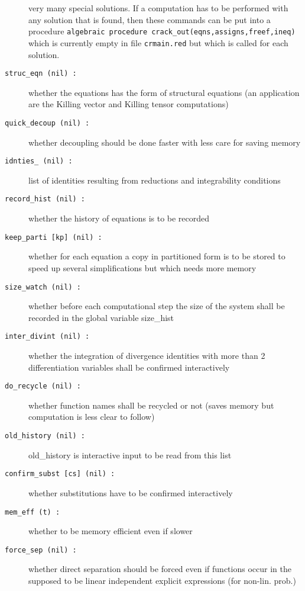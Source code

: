 \documentclass[12pt]{article}
\begin{document}
\begin{description}
                    very many special solutions. If a computation has
                    to be performed with any solution that is found,
                    then these commands can be put into a procedure
                 {\tt algebraic procedure crack\_out(eqns,assigns,freef,ineq)}
                    which is currently empty in file {\tt crmain.red}
                    but which is called for each solution.
\item[{\tt struc\_eqn (nil) :}] whether the equations has the form of
                    structural equations (an application are the
                    Killing vector and Killing tensor computations)
\item[{\tt quick\_decoup (nil) :}] whether decoupling should be done
                    faster with less care for saving memory
\item[{\tt idnties\_ (nil) :}] list of identities resulting from reductions and
                    integrability conditions
\item[{\tt record\_hist (nil) :}] whether the history of equations is
                    to be recorded 
\item[{\tt keep\_parti [kp] (nil) :}] whether for each equation a copy
                    in partitioned form is to be stored to speed up
                    several simplifications but which needs more memory
\item[{\tt size\_watch (nil) :}] whether before each computational step 
                   the size of the system shall be recorded in the
                   global variable size\_hist
\item[{\tt inter\_divint (nil) :}] whether the integration of divergence 
                   identities with more than 2 differentiation variables 
                   shall be confirmed interactively
\item[{\tt do\_recycle (nil) :}] whether function names shall be recycled 
                   or not (saves memory but computation is less clear to follow)
\item[{\tt old\_history (nil) :}] 
                   old\_history is interactive input to be read from
                   this list
\item[{\tt confirm\_subst [cs] (nil) :}] whether substitutions have to be 
                   confirmed interactively
\item[{\tt mem\_eff (t) :}] whether to be memory efficient even if slower
\item[{\tt force\_sep (nil) :}] whether direct separation should be forced even
                   if functions occur in the supposed to be linear
                   independent explicit expressions (for non-lin. prob.)
\end{description}
\end{document}
